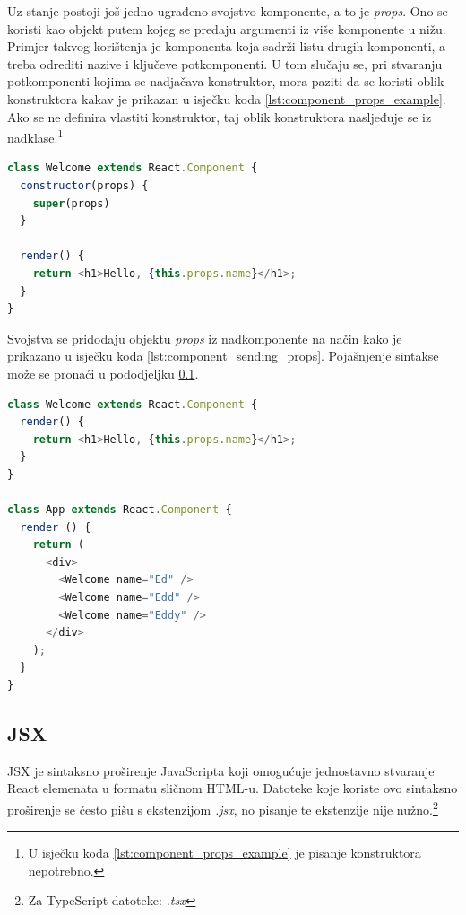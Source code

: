 \documentclass[times, utf8, zavrsni, numeric]{fer}
\newcommand{\razmakp}{\vspace{18pt}}
\newcommand{\razmaks}{\vspace{10pt}}
\begin{document}
\razmakp
\razmakp

Uz stanje postoji još jedno ugrađeno svojstvo komponente, a to je \emph{props}\citep{reactDocsComp&Props}.
Ono se koristi kao objekt putem kojeg se predaju argumenti iz više komponente u nižu.
Primjer takvog korištenja je komponenta koja sadrži listu drugih komponenti, a treba odrediti nazive i ključeve potkomponenti.
U tom slučaju se, pri stvaranju potkomponenti kojima se nadjačava konstruktor, mora paziti da se koristi oblik konstruktora kakav je prikazan u isječku koda \ref{lst:component_props_example}.
Ako se ne definira vlastiti konstruktor, taj oblik konstruktora nasljeđuje se iz nadklase.\footnote{U isječku koda \ref{lst:component_props_example} je pisanje konstruktora nepotrebno.}

\razmakp
\begin{lstlisting}[language=JavaScript, caption={Primjer komponente s \emph{props}}, label={lst:component_props_example}]
class Welcome extends React.Component {
  constructor(props) {
    super(props)
  }

  render() {
    return <h1>Hello, {this.props.name}</h1>;
  }
}
\end{lstlisting}
\razmaks

Svojstva se pridodaju objektu \emph{props} iz nadkomponente na način kako je prikazano u isječku koda \ref{lst:component_sending_props}.
Pojašnjenje sintakse može se pronaći u pododjeljku \ref{sec:jsx}.

\razmakp
\begin{lstlisting}[language=JavaScript, caption={Primjer korištenja \emph{props}}, label={lst:component_sending_props}]
class Welcome extends React.Component {
  render() {
    return <h1>Hello, {this.props.name}</h1>;
  }
}

class App extends React.Component {
  render () {
    return (
      <div>
        <Welcome name="Ed" />
        <Welcome name="Edd" />
        <Welcome name="Eddy" />
      </div>
    );
  }
}
\end{lstlisting}
\razmaks


\subsection{JSX} \label{sec:jsx}

JSX je sintaksno proširenje JavaScripta koji omogućuje jednostavno stvaranje React elemenata u formatu sličnom HTML-u.
Datoteke koje koriste ovo sintaksno proširenje se često pišu s ekstenzijom \glqq \emph{ .jsx}\grqq , no pisanje te ekstenzije nije nužno.\footnote{Za TypeScript datoteke: \glqq \emph{ .tsx}\grqq }
\end{document}
